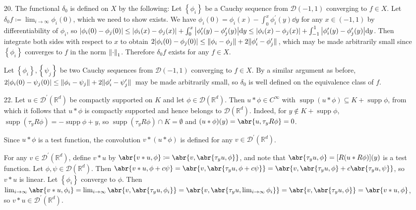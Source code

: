 \documentclass[11pt,leqno]{article}
\theoremstyle{plain}
\theoremstyle{definition}
\numberwithin{equation}{section}
\numberwithin{lem}{section}
\newcommand{\cbr}[1]{\left\{#1\right\}}
\DeclareMathOperator{\supp}{supp}
\begin{document}
\begin{enumerate}
    \item[20.] The functional $\delta_0$ is defined on $X$ by the following: Let $\cbr{\phi_i}$ be a Cauchy sequence from $\mathcal D(-1,1)$ converging to $f\in X$. Let $\delta_0f \coloneqq \lim_{i\to\infty}\phi_i(0)$, which we need to show exists. We have $\phi_i(0) = \phi_i(x) - \int_0^x\phi_i^\prime(y)\dd y$ for any $x\in(-1,1)$ by differentiability of $\phi_i$, so $\abs{\phi_i(0) - \phi_j(0)}\leq \abs{\phi_i(x) - \phi_j(x)} + \int_0^x\big|\phi_i^\prime(y) - \phi_j^\prime(y)\big|\dd y\leq \abs{\phi_i(x) - \phi_j(x)} + \int_{-1}^1\big|\phi_i^\prime(y) - \phi_j^\prime(y)\big|\dd y$. Then integrate both sides with respect to $x$ to obtain $2\abs{\phi_i(0) - \phi_j(0)}\leq\norm{\phi_i-\phi_j} +2\norm*{\phi_i^\prime - \phi_j^\prime}$, which may be made arbitrarily small since $\cbr{\phi_i}$ converges to $f$ in the norm $\norm{\cdot}_1$. Therefore $\delta_0f$ exists for any $f\in X$.
    
    Let $\cbr{\phi_i},\cbr{\psi_j}$ be two Cauchy sequences from $\mathcal D(-1,1)$ converging to $f\in X$. By a similar argument as before, $2\abs{\phi_i(0) - \psi_j(0)}\leq \norm{\phi_i-\psi_j} + 2\norm*{\phi_i^\prime-\psi_j^\prime}$ may be made arbitrarily small, so $\delta_0$ is well defined on the equivalence class of $f$.
    \item[22.] Let $u\in \mathcal D^\prime(\mathbb R^d)$ be compactly supported on $K$ and let $\phi\in\mathcal D(\mathbb R^d)$. Then $u\ast\phi\in C^\infty$ with $\supp(u\ast\phi)\subseteq K+\supp\phi$, from which it follows that $u\ast\phi$ is compactly supported and hence belongs to $\mathcal D(\mathbb R^d)$. Indeed, for $y\not\in K+\supp\phi$, $\supp(\tau_yR\phi) = -\supp\phi + y$, so $\supp(\tau_yR\phi)\cap K = \emptyset$ and $(u\ast\phi)(y) = \abr{u,\tau_yR\phi} = 0$.
    
    Since $u\ast \phi$ is a test function, the convolution $v\ast(u\ast \phi)$ is defined for any $v\in\mathcal D^\prime(\mathbb R^d)$.

    For any $v\in\mathcal D^\prime(\mathbb R^d)$, define $v\ast u$ by $\abr{v\ast u,\phi}\coloneqq \abr{v,\abr{\tau_yu,\phi}}$, and note that $\abr{\tau_yu,\phi} = [R(u\ast R\phi)](y)$ is a test function. Let $\phi,\psi\in\mathcal D(\mathbb R^d)$. Then $\abr{v\ast u,\phi+c\psi} = \abr{v,\abr{\tau_yu,\phi+c\psi}} = \abr{v,\abr{\tau_yu,\phi} + c\abr{\tau_yu,\psi}}$, so $v\ast u$ is linear. Let $\cbr{\phi_i}$ converge to $\phi$. Then $\lim_{i\to\infty}\abr{v\ast u,\phi_i} = \lim_{i\to\infty}\abr{v,\abr{\tau_yu,\phi_i}} = \abr{v,\abr{\tau_yu,\lim_{i\to\infty} \phi_i}} = \abr{v,\abr{\tau_yu,\phi}} = \abr{v\ast u,\phi}$, so $v\ast u\in\mathcal D^\prime(\mathbb R^d)$.
    

\end{enumerate}
\end{document}
